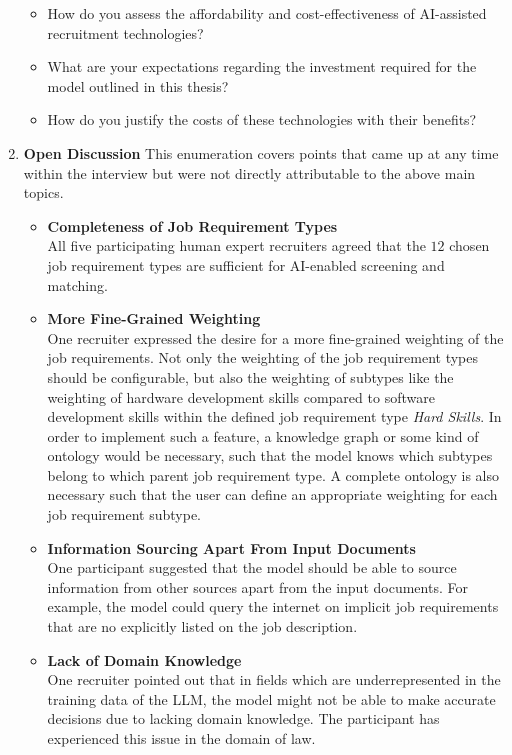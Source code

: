 \documentclass[draft,final]{thesisclass} %
\begin{document}
\begin{enumerate}
    \begin{itemize}
        \item How do you assess the affordability and cost-effectiveness of \acs{AI}-assisted recruitment technologies?
        \item What are your expectations regarding the investment required for the model outlined in this thesis?
        \item How do you justify the costs of these technologies with their benefits?
    \end{itemize}
    \item \textbf{Open Discussion}
    This enumeration covers points that came up at any time within the interview but were not directly attributable to the above main topics.
    \begin{itemize}
        \item \textbf{Completeness of Job Requirement Types}\\
        All five participating human expert recruiters agreed that the $12$ chosen job requirement types are sufficient for \acs{AI}-enabled screening and matching.
        \item \textbf{More Fine-Grained Weighting}\\
        One recruiter expressed the desire for a more fine-grained weighting of the job requirements. 
        Not only the weighting of the job requirement types should be configurable, but also the weighting of subtypes like the weighting of hardware development skills compared to software development skills within the defined job requirement type \textit{Hard Skills}.
        In order to implement such a feature, a knowledge graph or some kind of ontology would be necessary, such that the model knows which subtypes belong to which parent job requirement type. A complete ontology is also necessary such that the user can define an appropriate weighting for each job requirement subtype.
        \item \textbf{Information Sourcing Apart From Input Documents}\\
        One participant suggested that the model should be able to source information from other sources apart from the input documents.
        For example, the model could query the internet on implicit job requirements that are no explicitly listed on the job description.
        \item \textbf{Lack of Domain Knowledge}\\
        One recruiter pointed out that in fields which are underrepresented in the training data of the \acs{LLM}, the model might not be able to make accurate decisions due to lacking domain knowledge. The participant has experienced this issue in the domain of law.
    \end{itemize}
\end{enumerate}
\end{document}
